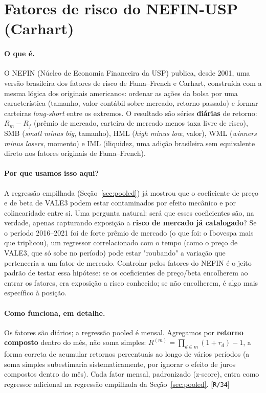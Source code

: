 \documentclass[11pt,a4paper]{article}
\newcommand{\porque}[0]{\paragraph{Por que usamos isso aqui?}}
\newcommand{\oquee}[0]{\paragraph{O que é.}}
\newcommand{\comofunciona}[0]{\paragraph{Como funciona, em detalhe.}}
\newcommand{\scriptref}[1]{{\footnotesize\color{cinza}[\texttt{#1}]}}
\begin{document}
\section{Fatores de risco do NEFIN-USP (Carhart)}
\label{sec:nefin}

\oquee O NEFIN (Núcleo de Economia Financeira da USP) publica, desde 2001, uma versão brasileira
dos fatores de risco de Fama--French e Carhart, construída com a mesma lógica dos originais
americanos: ordenar as ações da bolsa por uma característica (tamanho, valor contábil sobre
mercado, retorno passado) e formar carteiras \emph{long-short} entre os extremos. O resultado são
séries \textbf{diárias} de retorno: $R_m-R_f$ (prêmio de mercado, carteira de mercado menos taxa
livre de risco), SMB (\emph{small minus big}, tamanho), HML (\emph{high minus low}, valor), WML
(\emph{winners minus losers}, momento) e IML (iliquidez, uma adição brasileira sem equivalente
direto nos fatores originais de Fama--French).

\porque A regressão empilhada (Seção~\ref{sec:pooled}) já mostrou que o coeficiente de preço e de
beta de VALE3 podem estar contaminados por efeito mecânico e por colinearidade entre si. Uma
pergunta natural: será que esses coeficientes são, na verdade, apenas capturando exposição a
\textbf{risco de mercado já catalogado}? Se o período 2016--2021 foi de forte prêmio de mercado
(o que foi: o Ibovespa mais que triplicou), um regressor correlacionado com o tempo (como o preço
de VALE3, que só sobe no período) pode estar "roubando" a variação que pertenceria a um fator de
mercado. Controlar pelos fatores do NEFIN é o jeito padrão de testar essa hipótese: se os
coeficientes de preço/beta encolherem ao entrar os fatores, era exposição a risco conhecido; se não
encolherem, é algo mais específico à posição.

\comofunciona Os fatores são diários; a regressão pooled é mensal. Agregamos por
\textbf{retorno composto} dentro do mês, não soma simples: $R^{(m)}=\prod_{d\in m}(1+r_d)-1$,
a forma correta de acumular retornos percentuais ao longo de vários períodos (a soma simples
subestimaria sistematicamente, por ignorar o efeito de juros compostos dentro do mês). Cada fator
mensal, padronizado (z-score), entra como regressor adicional na regressão empilhada da
Seção~\ref{sec:pooled}. \scriptref{R/34}
\end{document}
